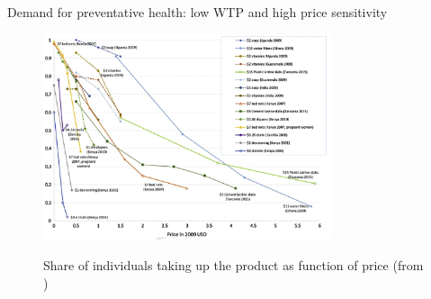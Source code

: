 \documentclass[aspectratio=169, 10pt, handout]{beamer}
\begin{document}
\begin{frame}{Demand for preventative health: low WTP and high price sensitivity}

\begin{figure}[htbp]
\begin{center}
\includegraphics[width=85mm]{Picture2.png} \\
\caption{Share of individuals taking up the product as function of price (from \cite{dupas2017impacts})}
\end{center}
\end{figure}

\end{frame}
\end{document}
